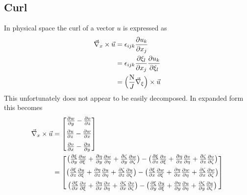 \subsection{Curl}
In physical space the curl of a vector $u$ is expressed as
\begin{align*}
  \vecnabla_x \times \vec{u}
  &= \epsilon_{ijk}\fpartial{u_k}{x_j}{1} \\
  &= \epsilon_{ijk} \fpartial{\xi_l}{x_j}{1} \fpartial{u_k}{\xi_l}{1} \\
  &= \Big(\NJ \vecnabla_{\xi} \Big) \times \vec{u}
\end{align*}
This unfortunately does not appear to be easily decomposed. In expanded form this becomes
\begin{align*}
  \vecnabla_x \times \vec{u}
  &=
    \begin{bmatrix}
      \fpartial{w}{y}{1} - \fpartial{v}{z}{1} \\[1.5ex]
      \fpartial{u}{z}{1} - \fpartial{w}{x}{1} \\[1.5ex]
      \fpartial{v}{x}{1} - \fpartial{u}{y}{1} 
    \end{bmatrix} \\
  &=
    \begin{bmatrix}
      \big( \fpartial{\xi}{y}{1} \fpartial{w}{\xi}{1} + \fpartial{\eta}{y}{1} \fpartial{w}{\eta}{1} + \fpartial{\zeta}{y}{1} \fpartial{w}{\zeta}{1} \big) -
      \big( \fpartial{\xi}{z}{1} \fpartial{v}{\xi}{1} + \fpartial{\eta}{z}{1} \fpartial{v}{\eta}{1} + \fpartial{\zeta}{z}{1} \fpartial{v}{\zeta}{1} \big) \\[1.5ex]
      \big( \fpartial{\xi}{z}{1} \fpartial{u}{\xi}{1} + \fpartial{\eta}{z}{1} \fpartial{u}{\eta}{1} + \fpartial{\zeta}{z}{1} \fpartial{u}{\zeta}{1} \big) -
      \big( \fpartial{\xi}{x}{1} \fpartial{w}{\xi}{1} + \fpartial{\eta}{x}{1} \fpartial{w}{\eta}{1} + \fpartial{\zeta}{x}{1} \fpartial{w}{\zeta}{1} \big) \\[1.5ex]
      \big( \fpartial{\xi}{x}{1} \fpartial{v}{\xi}{1} + \fpartial{\eta}{x}{1} \fpartial{v}{\eta}{1} + \fpartial{\zeta}{x}{1} \fpartial{v}{\zeta}{1} \big) -
      \big( \fpartial{\xi}{y}{1} \fpartial{u}{\xi}{1} + \fpartial{\eta}{y}{1} \fpartial{u}{\eta}{1} + \fpartial{\zeta}{y}{1} \fpartial{u}{\zeta}{1} \big)
    \end{bmatrix}
\end{align*}


\ifx\havefulldoc\undefined

\fi
